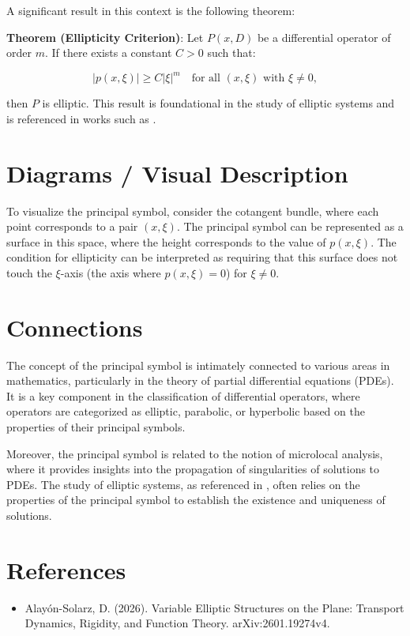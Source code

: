 \documentclass[11pt,a4paper]{article}
\begin{document}
A significant result in this context is the following theorem:

\textbf{Theorem (Ellipticity Criterion)}: Let \(P(x, D)\) be a differential operator of order \(m\). If there exists a constant \(C > 0\) such that:

$$
|p(x, \xi)| \geq C |\xi|^m \quad \text{for all } (x, \xi) \text{ with } \xi \neq 0,$$

then \(P\) is elliptic. This result is foundational in the study of elliptic systems and is referenced in works such as \cite{2601.19274}.

\section{Diagrams / Visual Description}
To visualize the principal symbol, consider the cotangent bundle, where each point corresponds to a pair \((x, \xi)\). The principal symbol can be represented as a surface in this space, where the height corresponds to the value of \(p(x, \xi)\). The condition for ellipticity can be interpreted as requiring that this surface does not touch the \(\xi\)-axis (the axis where \(p(x, \xi) = 0\)) for \(\xi \neq 0\).

\section{Connections}
The concept of the principal symbol is intimately connected to various areas in mathematics, particularly in the theory of partial differential equations (PDEs). It is a key component in the classification of differential operators, where operators are categorized as elliptic, parabolic, or hyperbolic based on the properties of their principal symbols.

Moreover, the principal symbol is related to the notion of microlocal analysis, where it provides insights into the propagation of singularities of solutions to PDEs. The study of elliptic systems, as referenced in \cite{2601.19274}, often relies on the properties of the principal symbol to establish the existence and uniqueness of solutions.

\section{References}
\begin{itemize}
    \item Alayón-Solarz, D. (2026). Variable Elliptic Structures on the Plane: Transport Dynamics, Rigidity, and Function Theory. arXiv:2601.19274v4.
\end{itemize}
\end{document}
